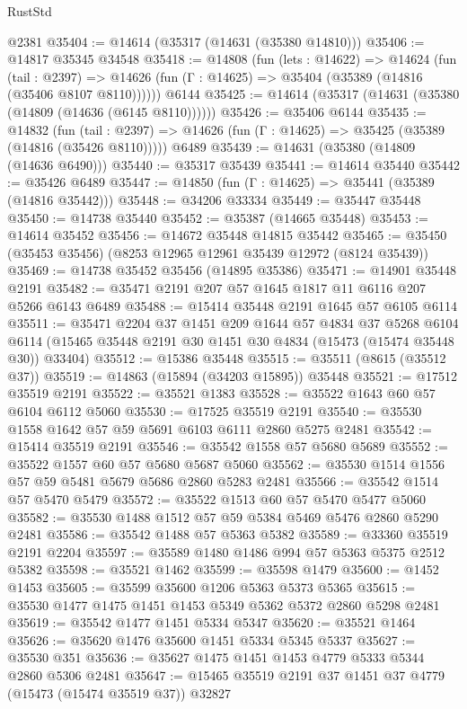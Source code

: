 \begin{lexlean}{RustStd}
\begin{coremodule}
    @2381
@35404 := @14614 (@35317 (@14631 (@35380 @14810)))
@35406 := @14817 @35345 @34548
@35418 := @14808
    (fun (lets : @14622) =>
    @14624
      (fun (tail : @2397) =>
      @14626 (fun (Γ : @14625) => @35404 (@35389 (@14816 (@35406 @8107 @8110))))))
    @6144
@35425 := @14614 (@35317 (@14631 (@35380 (@14809 (@14636 (@6145 @8110))))))
@35426 := @35406 @6144
@35435 := @14832
    (fun (tail : @2397) => @14626 (fun (Γ : @14625) => @35425 (@35389 (@14816 (@35426 @8110)))))
    @6489
@35439 := @14631 (@35380 (@14809 (@14636 @6490)))
@35440 := @35317 @35439
@35441 := @14614 @35440
@35442 := @35426 @6489
@35447 := @14850 (fun (Γ : @14625) => @35441 (@35389 (@14816 @35442)))
@35448 := @34206 @33334
@35449 := @35447 @35448
@35450 := @14738 @35440
@35452 := @35387 (@14665 @35448)
@35453 := @14614 @35452
@35456 := @14672 @35448 @14815 @35442
@35465 := @35450 (@35453 @35456) (@8253 @12965 @12961 @35439 @12972 (@8124 @35439))
@35469 := @14738 @35452 @35456 (@14895 @35386)
@35471 := @14901 @35448 @2191
@35482 := @35471 @2191 @207 @57 @1645 @1817 @11 @6116 @207 @5266 @6143 @6489
@35488 := @15414 @35448 @2191 @1645 @57 @6105 @6114
@35511 := @35471
    @2204
    @37
    @1451
    @209
    @1644
    @57
    @4834
    @37
    @5268
    @6104
    @6114
    (@15465 @35448 @2191 @30 @1451 @30 @4834 (@15473 (@15474 @35448 @30)) @33404)
@35512 := @15386 @35448
@35515 := @35511 (@8615 (@35512 @37))
@35519 := @14863 (@15894 (@34203 @15895)) @35448
@35521 := @17512 @35519 @2191
@35522 := @35521 @1383
@35528 := @35522 @1643 @60 @57 @6104 @6112 @5060
@35530 := @17525 @35519 @2191
@35540 := @35530 @1558 @1642 @57 @59 @5691 @6103 @6111 @2860 @5275 @2481
@35542 := @15414 @35519 @2191
@35546 := @35542 @1558 @57 @5680 @5689
@35552 := @35522 @1557 @60 @57 @5680 @5687 @5060
@35562 := @35530 @1514 @1556 @57 @59 @5481 @5679 @5686 @2860 @5283 @2481
@35566 := @35542 @1514 @57 @5470 @5479
@35572 := @35522 @1513 @60 @57 @5470 @5477 @5060
@35582 := @35530 @1488 @1512 @57 @59 @5384 @5469 @5476 @2860 @5290 @2481
@35586 := @35542 @1488 @57 @5363 @5382
@35589 := @33360 @35519 @2191 @2204
@35597 := @35589 @1480 @1486 @994 @57 @5363 @5375 @2512 @5382
@35598 := @35521 @1462
@35599 := @35598 @1479
@35600 := @1452 @1453
@35605 := @35599 @35600 @1206 @5363 @5373 @5365
@35615 := @35530 @1477 @1475 @1451 @1453 @5349 @5362 @5372 @2860 @5298 @2481
@35619 := @35542 @1477 @1451 @5334 @5347
@35620 := @35521 @1464
@35626 := @35620 @1476 @35600 @1451 @5334 @5345 @5337
@35627 := @35530 @351
@35636 := @35627 @1475 @1451 @1453 @4779 @5333 @5344 @2860 @5306 @2481
@35647 := @15465 @35519 @2191 @37 @1451 @37 @4779 (@15473 (@15474 @35519 @37)) @32827

\end{coremodule}
\end{lexlean}
